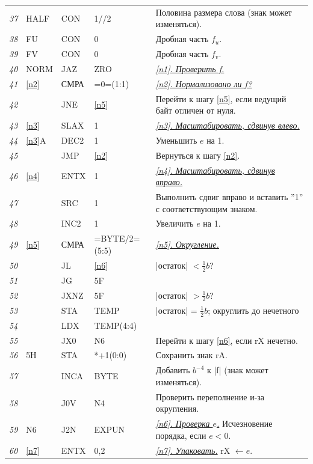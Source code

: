 \begin{longtable}{l l l l l}
\textit{37} & HALF & CON & 1//2	& Половина размера слова (знак может изменяться).\\
\textit{38}	& FU & CON & 0 & Дробная часть $f_u$.\\
\textit{39} & FV & CON & 0 & Дробная часть $f_v$.\\
\textit{40}	& NORM & JAZ & ZRO & \underline{\textit{\ref{n1}. Проверить f.}}\\
\textit{41}	& \ref{n2} & СМРА	& =0=(1:1) & \underline{\textit{\ref{n2}. Нормализовано ли f?}}\\
\textit{42}	& & JNE & \ref{n5} & Перейти к шагу \ref{n5}, если ведущий байт отличен от нуля.\\
\textit{43} & \ref{n3} & SLAX & 1 & \underline{\textit{\ref{n3}. Масштабировать, сдвинув влево.}}\\
\textit{44}	& \ref{n3}A & DEC2 & 1 & Уменьшить $e$ на 1.\\
\textit{45}	& & JMP & \ref{n2} & Вернуться к шагу \ref{n2}.\\
\textit{46} & \ref{n4} & ENTX & 1 & \underline{\textit{\ref{n4}. Масштабировать, сдвинув вправо.}}\\
\textit{47}	& & SRC & 1 & Выполнить сдвиг вправо и вставить ''1'' с соответствующим знаком.\\
\textit{48}	& & INC2 & 1 & Увеличить $e$ на 1.\\
\textit{49} & \ref{n5}& СМРА & =BYTE/2=(5:5) & \underline{\textit{\ref{n5}. Округление.}}\\
\textit{50}	& & JL & \ref{n6} & |остаток| $< \frac{1}{2}b$?\\
\textit{51}	& & JG & 5F &\\	
\textit{52}	& & JXNZ & 5F & |остаток| $> \frac{1}{2}b$?\\
\textit{53}	& & STA & TEMP & |остаток| = $\frac{1}{2}b$; округлить до нечетного\\
\textit{54}	& & LDX & TEMP(4:4) &\\	
\textit{55}	& &	JX0 & N6 & Перейти к шагу \ref{n6}, если rX нечетно.\\
\textit{56} & 5Н & STA & *+1(0:0) & Сохранить знак rA.\\
\textit{57}	& & INCA & BYTE & Добавить $b^{-4} $ к |f| (знак может изменяться).\\
\textit{58} & & J0V & N4 & Проверить переполнение и-за округления.\\
\textit{59} & N6 & J2N & EXPUN & \underline{\textit{\ref{n6}. Проверка $e$.}} Исчезновение порядка, если $e < 0$.\\
\textit{60}	& \ref{n7} & ENTX & 0,2 & \underline{\textit{\ref{n7}. Упаковать.}} rX $\leftarrow e$.\\

\end{longtable}
